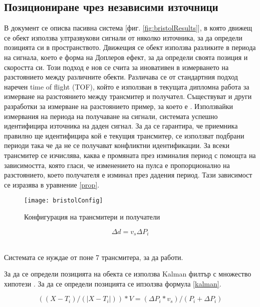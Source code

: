 \subsection{Позициониране чрез независими източници}

В документ \cite{bristolBeacons} се описва пасивна система [фиг. \ref{fig:bristolResults}], в която движещ се обект използва ултразвукови сигнали от няколко източника, за да определи позицията си в пространството. Движещия се обект използва разликите в периода на сигнала, което е форма на Доплеров ефект, за да определи своята позиция и скоростта си. Този подход е нов се счита за иновативен в измерването на разстоянието между различните обекти. Различава се от стандартния подход наречен time of flight (TOF), който е използван в текущата дипломна работа за измерване на разстоянието между трансмитер и получател. Съществуват и други разработки за измерване на разстоянието пример, за което е \cite{fastAndAccurate}. Използвайки измервания на периода на получаване на сигнали, системата успешно идентифицира източника на даден сигнал. За да се гарантира, че приемника правилно ще идентифицира кой е текущия трансмитер, се използват подбрани периоди така че да не се получават конфликтни идентификации. За всеки трансмитер се изчислява, каква е промяната през изминалия период с помощта на зависимостта, която гласи, че изменението на пулса е пропорционално на разстоянието, което получателя е изминал през дадения период. Тази зависимост се изразява в уравнение \ref{prop}.

\begin{figure}
    \centering
    \centerline{\texttt{[image: bristolConfig]}}
    \caption{Конфигурация на трансмитери и получатели}
    \label{bristolVis}
\end{figure}


\centerline{\begin{equation} \label{prop}
    \Delta d = v_s \Delta P_i
\end{equation}} \\

Системата се нуждае от поне 7 трансмитера, за да работи. 

За да се определи позицията на обекта се използва Kalman филтър с множество хипотези \cite{kalmanFilter}. За да се определи позицията се ипзолзва формула \ref{kalman}.

\centerline{\begin{equation} \label{kalman}
    ((X-T_i)/ (|X-T_i|)) * V = (\Delta P_i * v_s) / (P_i + \Delta P_i)
\end{equation}}\\

